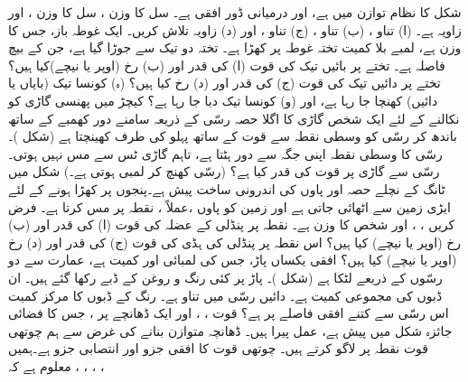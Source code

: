 شکل   کا نظام توازن میں ہے، اور درمیانی ڈور  افقی ہے۔ سل   کا وزن ، سل   کا وزن ، اور زاویہ  ہے۔ (ا)  تناو ، (ب) تناو ، (ج) تناو ، اور (د) زاویہ  تلاش کریں۔
ایک غوطہ باز، جس کا وزن   ہے،  لمبے  بلا کمیت تختہ غوطہ پر کھڑا ہے۔ تختہ دو  تیک   سے جوڑا گیا ہے، جن کے بیچ فاصلہ  ہے۔ تختے   پر   بائیں تیک  کی قوت (ا) کی قدر اور (ب) رخ  (اوپر  یا نیچے)کیا ہیں؟ تختے پر دائیں تیک کی قوت (ج) کی قدر اور (د) رخ کیا ہیں؟ (ہ)  کونسا تیک (بایاں یا دائیں)  کھنچا جا رہا ہے، اور (و) کونسا تیک دبا جا رہا ہے؟
 کیچڑ  میں پھنسی گاڑی  کو نکالنے کے لئے ایک شخص گاڑی کا اگلا حصہ  رسّی کے ذریعہ سامنے  دور  کھمبے کے ساتھ باندھ کر رسّی  کو وسطی نقطہ
  سے  قوت کے ساتھ   پہلو کی  طرف کھینچتا ہے (شکل )۔ رسّی کا وسطی نقطہ اپنی جگہ سے   دور ہٹتا ہے، تاہم گاڑی ٹس سے مس نہیں ہوتی۔ رسّی سے گاڑی پر قوت کی قدر کیا ہے؟ (رسّی کھنچ کر لمبی ہوتی ہے۔)
شکل   میں  ٹانگ کے نچلے حصہ اور پاوں کی اندرونی ساخت  پیش ہے۔پنجوں پر  کھڑا ہونے کے لئے   ایڑی  زمین سے اٹھائی جاتی ہے اور  زمین کو پاوں   ،عملاً ، نقطہ  پر مس کرتا ہے۔ فرض کریں ، ، اور   شخص کا وزن  ہے۔    نقطہ  پر  پنڈلی  کے عضلہ کی قوت  (ا) کی قدر اور (ب) رخ  (اوپر یا نیچے) کیا ہیں؟ اس نقطہ پر پنڈلی کی  ہڈی  کی قوت (ج) کی قدر اور (د) رخ (اوپر یا نیچے) کیا ہیں؟
افقی یکساں  پاڑ، جس کی لمبائی  اور کمیت  ہے، عمارت سے دو رسّوں کے ذریعے لٹکا ہے (شکل )۔ پاڑ پر کئی رنگ و روغن کے ڈبے رکھا گئے ہیں۔ ان ڈبوں کی مجموعی کمیت  ہے۔ دائیں رسّی میں تناو  ہے۔ رنگ کے ڈبوں کا مرکز کمیت اس رسّی سے کتنے  افقی فاصلے پر ہے؟
قوت  ، ، اور   ایک  ڈھانچے  پر ، جس کا فضائی جائزہ شکل  میں پیش ہے، عمل پیرا ہیں۔  ڈھانچہ متوازن بنانے کی غرض سے ہم چوتھی قوت نقطہ  پر لاگو کرتے ہیں۔ چوتھی قوت  کا افقی جزو  اور انتصابی جزو  ہے۔ہمیں معلوم ہے کہ ،  ، ، ، 
